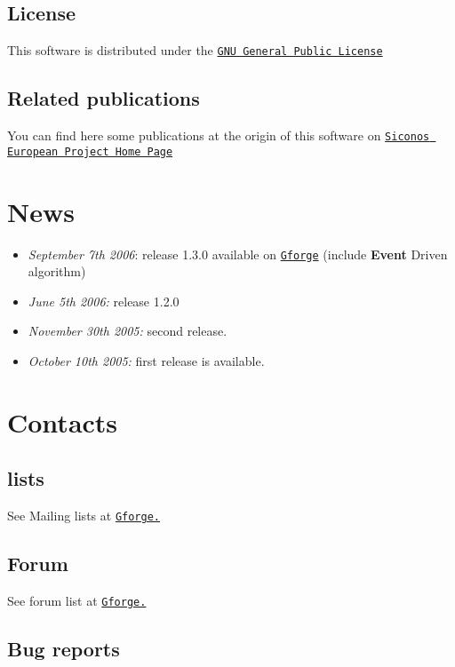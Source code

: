 \hypertarget{index_license}{}\subsection{License}\label{index_license}
This software is distributed under the \href{http://www.gnu.org/copyleft/gpl.html}{\tt GNU General Public License} \hypertarget{index_publi}{}\subsection{Related publications}\label{index_publi}
You can find here some publications at the origin of this software on \href{http://siconos.inrialpes.fr/}{\tt Siconos European Project Home Page} \hypertarget{index_news}{}\section{News}\label{index_news}
\begin{itemize}
\item {\em  September 7th 2006\/}: release 1.3.0 available on \href{http://gforge.inria.fr/projects/siconos}{\tt Gforge} (include {\bf Event} Driven algorithm)\item {\em  June 5th 2006:\/} release 1.2.0\item {\em  November 30th 2005:\/} second release.\item {\em  October 10th 2005:\/} first release is available. \end{itemize}
\hypertarget{index_contacts}{}\section{Contacts}\label{index_contacts}
\hypertarget{index_Mailing}{}\subsection{lists}\label{index_Mailing}
See Mailing lists at \href{https://gforge.inria.fr/mail/?group_id=9}{\tt Gforge.} \hypertarget{index_forum}{}\subsection{Forum}\label{index_forum}
See forum list at \href{https://gforge.inria.fr/forum/?group_id=9}{\tt Gforge.} \hypertarget{index_bug}{}\subsection{Bug reports}\label{index_bug}
